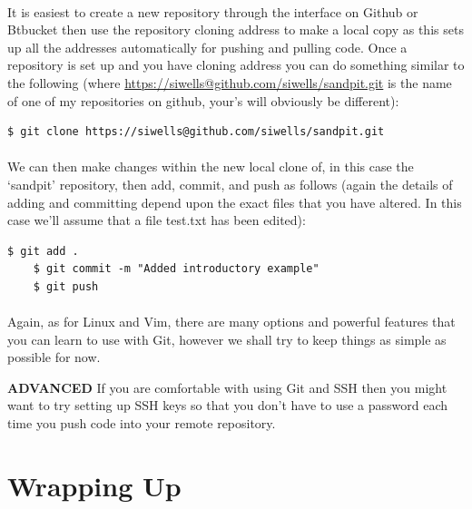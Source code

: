 \documentclass[12pt, a4paper, oneside]{book}
\begin{document}
\paragraph{} It is easiest to create a new repository through the interface on Github or Btbucket then use the repository cloning address to make a local copy as this sets up all the addresses automatically for pushing and pulling code. Once a repository is set up and you have cloning address you can do something similar to the following (where \url{https://siwells@github.com/siwells/sandpit.git} is the name of one of my repositories on github, your's will obviously be different):

\begin{lstlisting}[style=DOS]
    $ git clone https://siwells@github.com/siwells/sandpit.git
\end{lstlisting}

\paragraph{} We can then make changes within the new local clone of, in this case the `sandpit' repository, then add, commit, and push as follows (again the details of adding and committing depend upon the exact files that you have altered. In this case we'll assume that a file test.txt has been edited):

\begin{lstlisting}[style=DOS]
    $ git add .
    $ git commit -m "Added introductory example"
    $ git push
\end{lstlisting}

\paragraph{} Again, as for Linux and Vim, there are many options and powerful features that you can learn to use with Git, however we shall try to keep things as simple as possible for now.

\begin{framed}
\textbf{ADVANCED} If you are comfortable with using Git and SSH then you might want to try setting up SSH keys so that you don't have to use a password each time you push code into your remote repository.
\end{framed}

\section{Wrapping Up}
\label{chapter_01_wrap-up}
\end{document}
